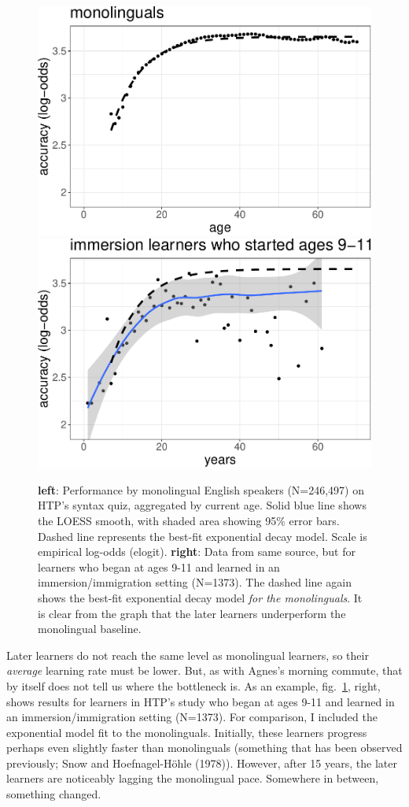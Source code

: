\documentclass[
  english,
  doc,floatsintext]{apa6}
\begin{document}
\begin{figure}
\includegraphics[width=0.45\linewidth]{SlikResponse_rmd_files/figure-latex/exponentials-1} \includegraphics[width=0.45\linewidth]{SlikResponse_rmd_files/figure-latex/exponentials-2} \caption{\textbf{left}: Performance by monolingual English speakers (N=246,497) on HTP's syntax quiz, aggregated by current age. Solid blue line shows the LOESS smooth, with shaded area showing 95\% error bars. Dashed line represents the best-fit exponential decay model. Scale is empirical log-odds (elogit). \textbf{right}: Data from same source, but for learners who began at ages 9-11 and learned in an immersion/immigration setting (N=1373). The dashed line again shows the best-fit exponential decay model \emph{for the monolinguals}. It is clear from the graph that the later learners underperform the monolingual baseline.}\label{fig:exponentials}
\end{figure}

Later learners do not reach the same level as monolingual learners, so their \emph{average} learning rate must be lower. But, as with Agnes's morning commute, that by itself does not tell us where the bottleneck is. As an example, fig.~\ref{fig:exponentials}, right, shows results for learners in HTP's study who began at ages 9-11 and learned in an immersion/immigration setting (N=1373). For comparison, I included the exponential model fit to the monolinguals. Initially, these learners progress perhaps even slightly faster than monolinguals (something that has been observed previously; Snow and Hoefnagel-Höhle (1978)). However, after 15 years, the later learners are noticeably lagging the monolingual pace. Somewhere in between, something changed.
\end{document}
